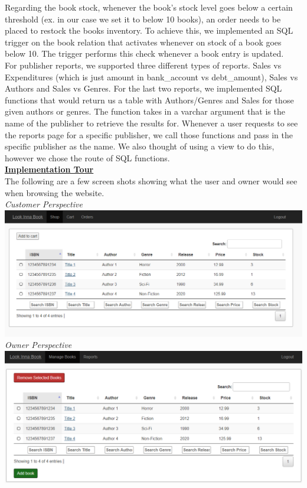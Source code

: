 \documentclass[a4 paper]{article}
\begin{document}
\noindent Regarding the book stock, whenever the book's stock level goes below a certain threshold (ex. in our case we set it to below 10 books), an order needs to be placed to restock the books inventory. To achieve this, we implemented an SQL trigger on the book relation that activates whenever on stock of a book goes below 10. The trigger performs this check whenever a book entry is updated.\\

\noindent For publisher reports, we supported three different types of reports. Sales vs Expenditures (which is just amount in bank\_account vs debt\_amount), Sales vs Authors and Sales vs Genres. For the last two reports, we implemented SQL functions that would return us a table with Authors/Genres and Sales for those given authors or genres. The function takes in a varchar argument that is the name of the publisher to retrieve the results for. Whenever a user requests to see the reports page for a specific publisher, we call those functions and pass in the specific publisher as the name. We also thought of using a view to do this, however we chose the route of SQL functions.\\

\noindent \underline{\textbf{Implementation Tour}}\\
The following are a few screen shots showing what the user and owner would see when browsing the website.\\

\noindent\emph{Customer Perspective}\\
\includegraphics[scale=0.5]{../Images/user_book_page.png}\\

\noindent\emph{Owner Perspective}\\
\includegraphics[scale=0.5]{../Images/owner_book_page.png}\\
\end{document}
